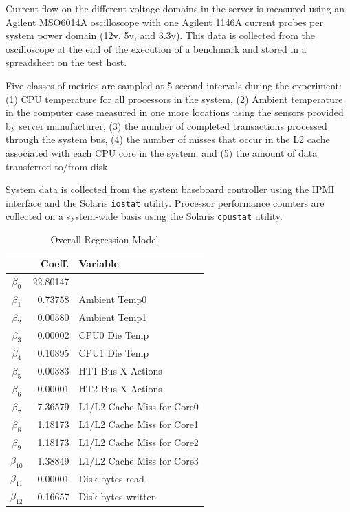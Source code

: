 \documentclass[times, 10pt, finalversion]{usetex-v1}
\begin{document}
Current flow on the different voltage domains in the server is measured
using an Agilent MSO6014A oscilloscope with one Agilent 1146A current
probes per system power domain (12v, 5v, and 3.3v). This data is
collected from the oscilloscope at the end of the execution of a
benchmark and stored in a spreadsheet on the test host.

Five classes of metrics are sampled at 5 second intervals during the
experiment: (1) CPU temperature for all processors in the system, (2)
Ambient temperature in the computer case measured in one more locations
using the sensors provided by server manufacturer, (3) the number of
completed transactions processed through the system bus, (4) the
number of misses that occur in the L2 cache associated with each CPU
core in the system, and (5) the amount of data transferred to/from disk.

System data is collected from the system baseboard controller using the
IPMI interface and the Solaris \texttt{iostat} utility. Processor
performance counters are collected on a system-wide basis using the
Solaris \texttt{cpustat} utility.
\begin{small}
\begin{table}[th]
  \centering
  \caption{Overall Regression Model}
  \label{tab:model}
  \begin{tabular}{c r l}
    \hline
&Coeff.&Variable\\
\hline
$\beta_{0}$& 22.80147 &\\
$\beta_{1}$&  0.73758 &Ambient Temp0\\
$\beta_{2}$&  0.00580 &Ambient Temp1\\
$\beta_{3}$&  0.00002 &CPU0 Die Temp\\
$\beta_{4}$&  0.10895 &CPU1 Die Temp\\
$\beta_{5}$&  0.00383 &HT1 Bus X-Actions\\
$\beta_{6}$&  0.00001 &HT2 Bus X-Actions\\
$\beta_{7}$&  7.36579 &L1/L2 Cache Miss for Core0\\
$\beta_{8}$&  1.18173 &L1/L2 Cache Miss for Core1\\
$\beta_{9}$&  1.18173 &L1/L2 Cache Miss for Core2\\
$\beta_{10}$& 1.38849 &L1/L2 Cache Miss for Core3\\
$\beta_{11}$& 0.00001 &Disk bytes read\\
$\beta_{12}$& 0.16657 &Disk bytes written\\
\hline \hline
  \end{tabular}
\end{table}
\end{small}
\end{document}

